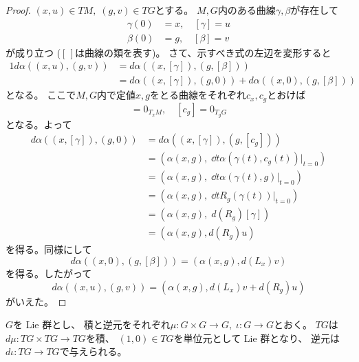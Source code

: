 \documentclass[report]{jlreq}
\begin{document}
\begin{proof}
    $(x, u) \in TM, \; (g, v) \in TG$とする。
    $M, G$内のある{\smooth}曲線$\gamma, \beta$が存在して
    \begin{align}
        \gamma(0) &= x, \quad [\gamma] = u \\
        \beta(0) &= g, \quad [\beta] = v
    \end{align}
    が成り立つ ($[ \, ]$は曲線の類を表す)。
    さて、示すべき式の左辺を変形すると
    \begin{alignat}{1}
        d\alpha((x, u), (g, v))
            &= d\alpha((x, [\gamma]), (g, [\beta])) \\
            &= d\alpha((x, [\gamma]), (g, 0))
                + d\alpha((x, 0), (g, [\beta]))
    \end{alignat}
    となる。
    ここで$M, G$内で定値$x, g$をとる曲線をそれぞれ$c_x, c_g$とおけば
    \begin{equation}
        [c_x] = 0_{T_xM}, \quad [c_g] = 0_{T_gG}
    \end{equation}
    となる。よって
    \begin{align}
        d\alpha((x, [\gamma]), (g, 0))
            &= d\alpha((x, [\gamma]), (g, [c_g])) \\
            &= \left(
                \alpha(x, g), \;
                \dd{t} \alpha(\gamma(t), c_g(t)) \Big|_{t = 0}
            \right) \\
            &= \left(
                \alpha(x, g), \;
                \dd{t} \alpha(\gamma(t), g) \Big|_{t = 0}
            \right) \\
            &= \left(
                \alpha(x, g), \;
                \dd{t} R_g(\gamma(t)) \Big|_{t = 0}
            \right) \\
            &= (
                \alpha(x, g), \;
                d(R_g) [\gamma]
            ) \\
            &= (\alpha(x, g), d(R_g) u)
    \end{align}
    を得る。同様にして
    \begin{equation}
        d\alpha((x, 0), (g, [\beta]))
            = (\alpha(x, g), d(L_x) v)
    \end{equation}
    を得る。したがって
    \begin{equation}
        d\alpha((x, u), (g, v))
            = (\alpha(x, g), d(L_x) v + d(R_g) u)
    \end{equation}
    がいえた。
\end{proof}

\begin{lemma}
    $G$を Lie 群とし、
    積と逆元をそれぞれ$\mu \colon G \times G \to G, \; \iota \colon G \to G$とおく。
    $TG$は$d\mu \colon TG \times TG \to TG$を積、
    $(1, 0) \in TG$を単位元として Lie 群となり、
    逆元は$d\iota \colon TG \to TG$で与えられる。
\end{lemma}
\end{document}

